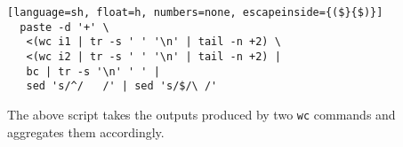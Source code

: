 \documentclass[letterpaper,twocolumn,10pt]{article}
\newcommand{\ttt}[1]{\texttt{\small #1}}
\newcommand{\nv}[1]{[{\color{cyan}#1 --- nv}]}
\newcommand{\kk}[1]{[{\color{magenta}#1 --- kk}]}
\begin{document}
\begin{lstlisting}[language=sh, float=h, numbers=none, escapeinside={($}{$)}]
  paste -d '+' \
   <(wc i1 | tr -s ' ' '\n' | tail -n +2) \
   <(wc i2 | tr -s ' ' '\n' | tail -n +2) |
   bc | tr -s '\n' ' ' |
   sed 's/^/   /' | sed 's/$/\ /'
\end{lstlisting}

The above script takes the outputs produced by two \ttt{wc} commands
and aggregates them accordingly.





% 
% 
% 
% 
% 
%
\end{document}
